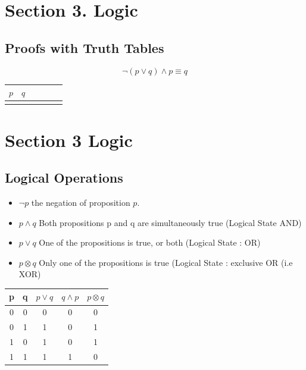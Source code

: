 \documentclass[]{report}
\begin{document}
\begin{enumerate}
\section*{Section 3. Logic}

\subsection*{Proofs with Truth Tables}

\[ \neg(p \vee q) \wedge p \equiv q \]
\begin{center}
\begin{tabular}{|c|c||c|c||c|c|}
\hline $p$ & $q$ &  &  &  &  \\ 
\hline  &  &  &  &  &  \\ 
\hline 
\end{tabular} 
\end{center}



\section{Section 3 Logic}
\subsection{Logical Operations}
\begin{itemize}
\item $\neg p$ the negation of proposition $p$.
\item $p \wedge q$ Both propositions p and q are simultaneously true (Logical State AND)
\item $p \vee q $ One of the propositions is true, or both (Logical State : OR)
\item $p \otimes q$ Only one of the propositions is true (Logical State : exclusive OR (i.e XOR)
\end{itemize}
\begin{center}
\begin{tabular}{|c|c|c|c|c|}
\hline
p & q & $p \vee q$ & $q \wedge p$ & $p \otimes q$ \\
\hline
0 & 0 & 0 & 0 & 0 \\
0 & 1 & 1 & 0 & 1\\
1 & 0 & 1 & 0 & 1 \\
1 & 1 & 1 & 1 & 0\\
\hline
\end{tabular}
\end{center}



\end{enumerate}
\end{document}
